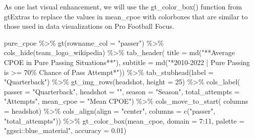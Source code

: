 \documentclass[
  letterpaper,
]{krantz}
\newenvironment{Shaded}{\begin{snugshade}}{\end{snugshade}}
\newcommand{\AttributeTok}[1]{\textcolor[rgb]{0.40,0.45,0.13}{#1}}
\newcommand{\DecValTok}[1]{\textcolor[rgb]{0.68,0.00,0.00}{#1}}
\newcommand{\FloatTok}[1]{\textcolor[rgb]{0.68,0.00,0.00}{#1}}
\newcommand{\FunctionTok}[1]{\textcolor[rgb]{0.28,0.35,0.67}{#1}}
\newcommand{\NormalTok}[1]{\textcolor[rgb]{0.00,0.23,0.31}{#1}}
\newcommand{\SpecialCharTok}[1]{\textcolor[rgb]{0.37,0.37,0.37}{#1}}
\newcommand{\StringTok}[1]{\textcolor[rgb]{0.13,0.47,0.30}{#1}}
\begin{document}
As one last visual enhancement, we will use the gt\_color\_box()
function from gtExtras to replace the values in mean\_cpoe with
colorboxes that are similar to those used in data visualizations on Pro
Football Focus.

\begin{Shaded}
\begin{Highlighting}[]
\NormalTok{pure\_cpoe }\SpecialCharTok{\%\textgreater{}\%}
  \FunctionTok{gt}\NormalTok{(}\AttributeTok{rowname\_col =} \StringTok{"passer"}\NormalTok{) }\SpecialCharTok{\%\textgreater{}\%}
  \FunctionTok{cols\_hide}\NormalTok{(team\_logo\_wikipedia) }\SpecialCharTok{\%\textgreater{}\%}
  \FunctionTok{tab\_header}\NormalTok{(}
    \AttributeTok{title =} \FunctionTok{md}\NormalTok{(}\StringTok{"**Average CPOE in Pure Passing Situations**"}\NormalTok{),}
    \AttributeTok{subtitle =} \FunctionTok{md}\NormalTok{(}\StringTok{"*2010{-}2022  |  Pure Passing is \textgreater{}= 70\%}
\StringTok{                  Chance of Pass Attempt*"}\NormalTok{)) }\SpecialCharTok{\%\textgreater{}\%}
  \FunctionTok{tab\_stubhead}\NormalTok{(}\AttributeTok{label =} \StringTok{"Quarterback"}\NormalTok{) }\SpecialCharTok{\%\textgreater{}\%}
  \FunctionTok{gt\_img\_rows}\NormalTok{(headshot, }\AttributeTok{height =} \DecValTok{25}\NormalTok{) }\SpecialCharTok{\%\textgreater{}\%}
  \FunctionTok{cols\_label}\NormalTok{(}
    \AttributeTok{passer =} \StringTok{"Quarterback"}\NormalTok{,}
    \AttributeTok{headshot =} \StringTok{""}\NormalTok{,}
    \AttributeTok{season =} \StringTok{"Season"}\NormalTok{,}
    \AttributeTok{total\_attempts =} \StringTok{"Attempts"}\NormalTok{,}
    \AttributeTok{mean\_cpoe =} \StringTok{"Mean CPOE"}\NormalTok{) }\SpecialCharTok{\%\textgreater{}\%}
  \FunctionTok{cols\_move\_to\_start}\NormalTok{(}
    \AttributeTok{columns =}\NormalTok{ headshot) }\SpecialCharTok{\%\textgreater{}\%}
  \FunctionTok{cols\_align}\NormalTok{(}\AttributeTok{align =} \StringTok{"center"}\NormalTok{, }\AttributeTok{columns =} \FunctionTok{c}\NormalTok{(}\StringTok{"passer"}\NormalTok{, }\StringTok{"total\_attempts"}\NormalTok{)) }\SpecialCharTok{\%\textgreater{}\%}
  \FunctionTok{gt\_color\_box}\NormalTok{(mean\_cpoe, }\AttributeTok{domain =} \DecValTok{7}\SpecialCharTok{:}\DecValTok{11}\NormalTok{,}
               \AttributeTok{palette =} \StringTok{"ggsci::blue\_material"}\NormalTok{, }\AttributeTok{accuracy =} \FloatTok{0.01}\NormalTok{)}
\end{Highlighting}
\end{Shaded}
\end{document}
